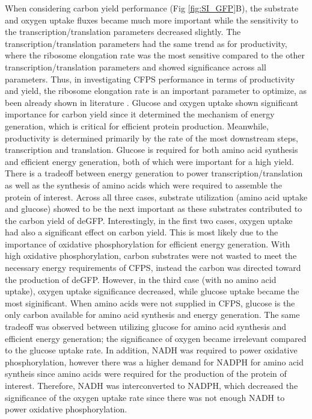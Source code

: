 \documentclass[journal=asbcd6,manuscript=article]{achemso}
\begin{document}
When considering carbon yield performance (Fig \ref{fig:SI_GFP}B), the substrate and oxygen uptake fluxes became much more important while the sensitivity to the transcription/translation parameters decreased slightly.
The transcription/translation parameters had the same trend as for productivity, where the ribosome elongation rate was the most sensitive compared to the other transcription/translation parameters and showed significance across all parameters.
Thus, in investigating CFPS performance in terms of productivity and yield, the ribosome elongation rate is an important parameter to optimize, as been already shown in literature \cite{2005_underwood_biotech, 2014_li_PlosOne}.
Glucose and oxygen uptake shown significant importance for carbon yield since it determined the mechanism of energy generation, which is critical for efficient protein production.
Meanwhile, productivity is determined primarily by the rate of the most downstream steps, transcription and translation.
Glucose is required for both amino acid synthesis and efficient energy generation, both of which were important for a high yield.
There is a tradeoff between energy generation to power transcription/translation as well as the synthesis of amino acids which were required to assemble the protein of interest.
Across all three cases, substrate utilization (amino acid uptake and glucose) showed to be the next important as these substrates contributed to the carbon yield of deGFP.
Interestingly, in the first two cases, oxygen uptake had also a significant effect on carbon yield.
This is most likely due to the importance of oxidative phosphorylation for efficient energy generation.
With high oxidative phosphorylation, carbon substrates were not wasted to meet the necessary energy requirements of CFPS, instead the carbon was directed toward the production of deGFP.
However, in the third case (with no amino acid uptake), oxygen uptake significance decreased, while glucose uptake became the most siginificant.
When amino acids were not supplied in CFPS, glucose is the only carbon available for amino acid synthesis and energy generation. 
The same tradeoff was observed between utilizing glucose for amino acid synthesis and efficient energy generation; the significance of oxygen became irrelevant compared to the glucose uptake rate. 
In addition, NADH was required to power oxidative phosphorylation, however there was a higher demand for NADPH for amino acid syntheis since amino acids were required for the production of the protein of interest. 
Therefore, NADH was interconverted to NADPH, which decreased the significance of the oxygen uptake rate since there was not enough NADH to power oxidative phosphorylation.
\end{document}
